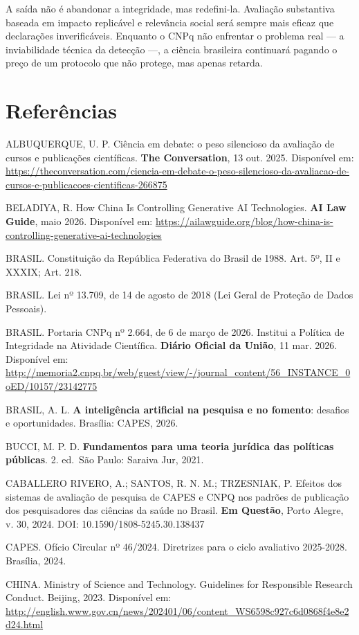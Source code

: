 \documentclass[
  12pt,
  a4paper,
  brazil,
  twoside
]{report}
\begin{document}
A saída não é abandonar a integridade, mas redefini-la. Avaliação
substantiva baseada em impacto replicável e relevância social será
sempre mais eficaz que declarações inverificáveis. Enquanto o CNPq não
enfrentar o problema real --- a inviabilidade técnica da detecção ---, a
ciência brasileira continuará pagando o preço de um protocolo que não
protege, mas apenas retarda.

\section{Referências}\label{referuxeancias}

ALBUQUERQUE, U. P. Ciência em debate: o peso silencioso da avaliação de
cursos e publicações científicas. \textbf{The Conversation}, 13 out.
2025. Disponível em:
\url{https://theconversation.com/ciencia-em-debate-o-peso-silencioso-da-avaliacao-de-cursos-e-publicacoes-cientificas-266875}

BELADIYA, R. How China Is Controlling Generative AI Technologies.
\textbf{AI Law Guide}, maio 2026. Disponível em:
\url{https://ailawguide.org/blog/how-china-is-controlling-generative-ai-technologies}

BRASIL. Constituição da República Federativa do Brasil de 1988. Art. 5º,
II e XXXIX; Art. 218.

BRASIL. Lei nº 13.709, de 14 de agosto de 2018 (Lei Geral de Proteção de
Dados Pessoais).

BRASIL. Portaria CNPq nº 2.664, de 6 de março de 2026. Institui a
Política de Integridade na Atividade Científica. \textbf{Diário Oficial
da União}, 11 mar. 2026. Disponível em:
\url{http://memoria2.cnpq.br/web/guest/view/-/journal_content/56_INSTANCE_0oED/10157/23142775}

BRASIL, A. L. \textbf{A inteligência artificial na pesquisa e no
fomento}: desafios e oportunidades. Brasília: CAPES, 2026.

BUCCI, M. P. D. \textbf{Fundamentos para uma teoria jurídica das
políticas públicas}. 2. ed.~São Paulo: Saraiva Jur, 2021.

CABALLERO RIVERO, A.; SANTOS, R. N. M.; TRZESNIAK, P. Efeitos dos
sistemas de avaliação de pesquisa de CAPES e CNPQ nos padrões de
publicação dos pesquisadores das ciências da saúde no Brasil. \textbf{Em
Questão}, Porto Alegre, v. 30, 2024. DOI: 10.1590/1808-5245.30.138437

CAPES. Ofício Circular nº 46/2024. Diretrizes para o ciclo avaliativo
2025-2028. Brasília, 2024.

CHINA. Ministry of Science and Technology. Guidelines for Responsible
Research Conduct. Beijing, 2023. Disponível em:
\url{http://english.www.gov.cn/news/202401/06/content_WS6598c927c6d0868f4e8e2d24.html}
\end{document}
